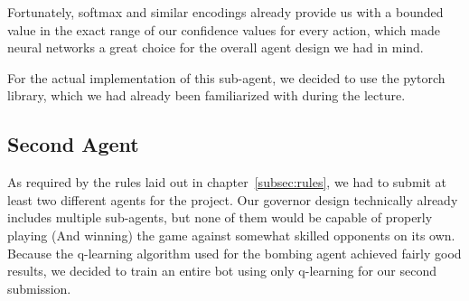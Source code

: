 Fortunately, softmax and similar encodings already provide us with a bounded value in the exact range of our confidence
values for every action, which made neural networks a great choice for the overall agent design we had in mind.

For the actual implementation of this sub-agent, we decided to use the pytorch library, which we had already been
familiarized with during the lecture.


\subsection{Second Agent}
\label{subsec:second-design}
As required by the rules laid out in chapter~\ref{subsec:rules}, we had to submit at least two different agents for the
project.
Our governor design technically already includes multiple sub-agents, but none of them would be capable of properly
playing (And winning) the game against somewhat skilled opponents on its own.
Because the q-learning algorithm used for the bombing agent achieved fairly good results, we decided to train an entire
bot using only q-learning for our second submission.
